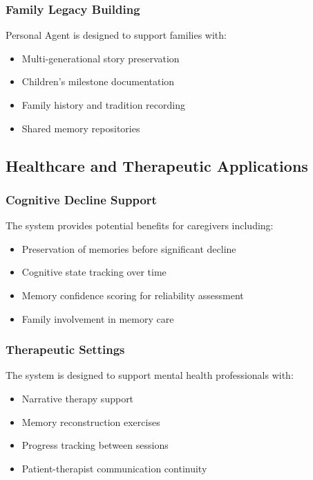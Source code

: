 \documentclass[11pt,letterpaper]{article}
\begin{document}
\subsubsection{Family Legacy Building}

Personal Agent is designed to support families with:
\begin{itemize}
\item Multi-generational story preservation
\item Children's milestone documentation
\item Family history and tradition recording
\item Shared memory repositories
\end{itemize}

\subsection{Healthcare and Therapeutic Applications}

\subsubsection{Cognitive Decline Support}

The system provides potential benefits for caregivers including:
\begin{itemize}
\item Preservation of memories before significant decline
\item Cognitive state tracking over time
\item Memory confidence scoring for reliability assessment
\item Family involvement in memory care
\end{itemize}

\subsubsection{Therapeutic Settings}

The system is designed to support mental health professionals with:
\begin{itemize}
\item Narrative therapy support
\item Memory reconstruction exercises
\item Progress tracking between sessions
\item Patient-therapist communication continuity
\end{itemize}
\end{document}
